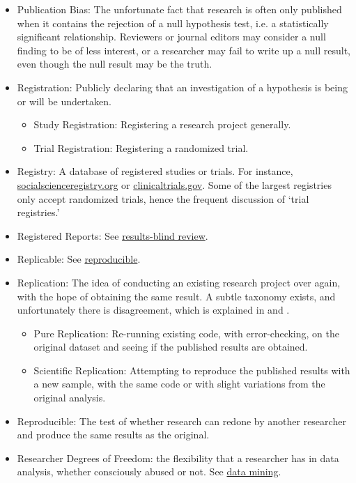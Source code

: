 \documentclass[12pt] {article}
\begin{document}
\begin{itemize}
\item
Publication Bias: The unfortunate fact that research is often only published when it contains the rejection of a null hypothesis test, i.e. a statistically significant relationship. Reviewers or journal editors may consider a null finding to be of less interest, or a researcher may fail to write up a null result, even though the null result may be the truth.

\item
Registration: Publicly declaring that an investigation of a hypothesis is being or will be undertaken.
\begin{itemize}
\item  Study Registration: Registering a research project generally.
\item  Trial Registration: Registering a randomized trial. 
\end{itemize}
\item
Registry: A database of registered studies or trials. For instance, \url{socialscienceregistry.org} or \url{clinicaltrials.gov}. Some of the largest registries only accept randomized trials, hence the frequent discussion of ‘trial registries.’

\item
Registered Reports: See \hyperref[def-dbp]{results-blind review}.

\item
Replicable: See \hyperref[def-repro]{reproducible}.

\item
Replication: The idea of conducting an existing research project over again, with the hope of obtaining the same result. A subtle taxonomy exists, and unfortunately there is disagreement, which is explained in \cite{hamermesh_viewpoint:_2007} and \cite{clemens_replication}.
\begin{itemize}
\item
Pure Replication: Re-running existing code, with error-checking, on the original dataset and seeing if the published results are obtained.
\item
Scientific Replication: Attempting to reproduce the published results with a new sample, with the same code or with slight variations from the original analysis.
\end{itemize}

\item \label{def-repro}
Reproducible: The test of whether research can redone by another researcher and produce the same results as the original. 
\item
Researcher Degrees of Freedom: the flexibility that a researcher has in data analysis, whether consciously abused or not. See \hyperref[def-mining]{data mining}. 


\end{itemize}
\end{document}
